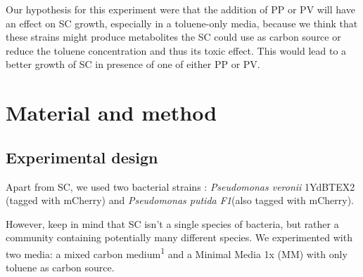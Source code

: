 \documentclass[a4paper, 10pt, conference]{ieeeconf}   %
\begin{document}



Our hypothesis for this experiment were that the addition of PP or PV will have an effect on SC growth, especially in a toluene-only media, because we think that these strains might produce metabolites the SC could use as carbon source or reduce the toluene concentration and thus its toxic effect. This would lead to a better growth of SC in presence of one of either PP or PV.


\section{Material and method}

\subsection{Experimental design}
Apart from SC, we used two bacterial strains : \textit{Pseudomonas veronii} 1YdBTEX2 (tagged with mCherry) and \textit{Pseudomonas putida F1}(also tagged with mCherry).

However, keep in mind that SC isn't a single species of bacteria, but rather a community containing potentially many different species.
We experimented with two media: a mixed carbon medium\textsuperscript{1} and a Minimal Media 1x (MM) with only toluene as carbon source.
\end{document}
